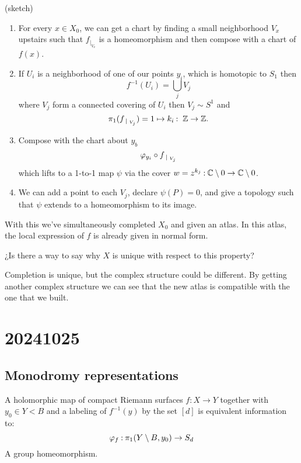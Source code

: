 \documentclass[12pt]{memoir}
\begin{document}
\begin{ptcbp}
    (sketch)
    \begin{enumerate}
        \item For every $x\in X_0$, we can get a chart by finding a small neighborhood $V_x$ upstairs such that $f_{\mid_{V_x}}$ is a homeomorphism and then compose with a chart of $f(x)$.
        \item If $U_{i}$ is a neighborhood of one of our points $y_i$, which is homotopic to $S_1$ then 
        $$f^{-1}(U_i)=\bigcup_j V_j$$
        where $V_j$ form a connected covering of $U_i$ then $V_j\sim S^1$ and 
        $$\pi_1(f_{\mid_{V_j}})=1\mapsto k_i\:\ \bZ\to\bZ.$$
        \item Compose with the chart about $y_b$
        $$\vf_{y_i}\circ f_{\mid_{V_j}}$$
        which lifts to a 1-to-1 map $\psi$ via the cover $w=z^{k_j}\mathbin{:}\mathbb{C}\setminus 0\to\mathbb{C}\setminus0$.
        \item We can add a point to each $V_j$, declare $\psi(P)=0$, and give a topology such that $\psi$ extends to a homeomorphism to its image.
     \end{enumerate}
     With this we've simultaneously completed $X_0$ and given an atlas. In this atlas, the local expression of $f$ is already given in normal form.
\end{ptcbp}

\begin{Qn}
    ¿Is there a way to say why $X$ is unique with respect to this property?
\end{Qn}

Completion is unique, but the complex structure could be different. By getting another complex structure we can see that the new atlas is compatible with the one that we built. 

\section{20241025}

\subsection{Monodromy representations}

A holomorphic map of compact Riemann surfaces $f:X\to Y$ together with $y_0\in Y\less B$ and a labeling of $f^{-1}(y)$ by the set $[d]$ is equivalent information to:
$$\varphi_f\mathbin{:} \pi_1(Y\setminus B,y_0)\to S_d$$
A group homeomorphism.\par
\end{document}
